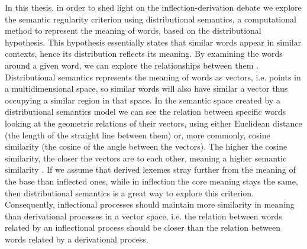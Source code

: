 \documentclass[12pt]{article}
\begin{document}

In this thesis, in order to shed light on the inflection-derivation debate we explore the semantic regularity criterion using distributional semantics, a computational method to represent the meaning of words, based on the distributional hypothesis. This hypothesis essentially states that similar words appear in similar contexts, hence its distribution reflects its meaning. By examining the words around a given word, we can explore the relationships between them \parencite{boleda2020DistributionalSemanticsLinguistic}.
Distributional semantics represents the meaning of words as vectors, i.e. points in a multidimensional space, so similar words will also have similar a vector thus occupying a similar region in that space. In the semantic space created by a distributional semantics model we can see the relation between specific words looking at the geometric relations of their vectors, using either Euclidean distance (the length of the straight line between them) or, more commonly, cosine similarity (the cosine of the angle between the vectors). The higher the cosine similarity, the closer the vectors are to each other, meaning a higher semantic similarity \parencite{boleda2020DistributionalSemanticsLinguistic,chandrasekaran2021EvolutionSemanticSimilarity}. 
If we assume that derived lexemes stray further from the meaning of the base than inflected ones, while in inflection the core meaning stays the same, then distributional semantics is a great way to explore this criterion. Consequently, inflectional processes should maintain more similarity in meaning than derivational processes in a vector space, i.e. the relation between words related by an inflectional process should be closer than the relation between words related by a derivational process. %
\end{document}
